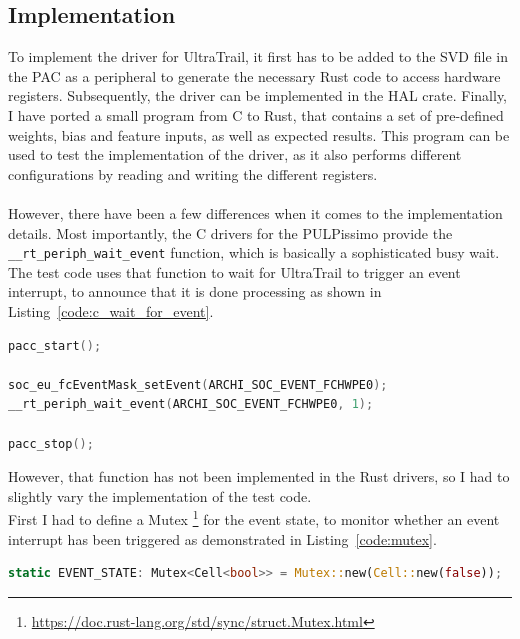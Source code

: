 \subsection{Implementation}

To implement the driver for UltraTrail, it first has to be added to the SVD file in the PAC
as a peripheral to generate the necessary Rust code to access hardware registers.
Subsequently, the driver can be implemented in the HAL crate.
Finally, I have ported a small program from C to Rust, that contains a set of pre-defined
weights, bias and feature inputs, as well as expected results.
This program can be used to test the implementation of the driver, as it also
performs different configurations by reading and writing the different registers.
\\\\
However, there have been a few differences when it comes to the implementation details.
Most importantly, the C drivers for the PULPissimo provide the \lstinline{__rt_periph_wait_event} function,
which is basically a sophisticated busy wait.
The test code uses that function to wait for UltraTrail to trigger an event interrupt, to announce that
it is done processing as shown in Listing~\ref{code:c_wait_for_event}.

\begin{minipage}{\textwidth}
\begin{lstlisting}[style=colorEX,language=C,caption={Waiting for the event in C},label={code:c_wait_for_event}]
pacc_start();

soc_eu_fcEventMask_setEvent(ARCHI_SOC_EVENT_FCHWPE0);
__rt_periph_wait_event(ARCHI_SOC_EVENT_FCHWPE0, 1);

pacc_stop();
\end{lstlisting}
\end{minipage}

However, that function has not been implemented in the Rust drivers, so I had to slightly
vary the implementation of the test code.\\
First I had to define a Mutex \footnote{\url{https://doc.rust-lang.org/std/sync/struct.Mutex.html}}
for the event state, to monitor whether an event interrupt has been triggered as demonstrated
in Listing~\ref{code:mutex}.

\begin{lstlisting}[style=colorEX,language=Rust,caption={Definition of the necessary Mutexes},label={code:mutex}]
static EVENT_STATE: Mutex<Cell<bool>> = Mutex::new(Cell::new(false));
\end{lstlisting}

